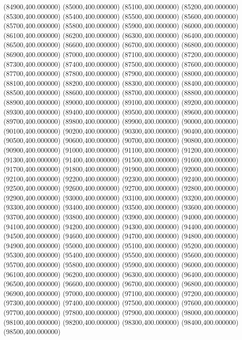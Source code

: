 (84900,400.000000)
(85000,400.000000)
(85100,400.000000)
(85200,400.000000)
(85300,400.000000)
(85400,400.000000)
(85500,400.000000)
(85600,400.000000)
(85700,400.000000)
(85800,400.000000)
(85900,400.000000)
(86000,400.000000)
(86100,400.000000)
(86200,400.000000)
(86300,400.000000)
(86400,400.000000)
(86500,400.000000)
(86600,400.000000)
(86700,400.000000)
(86800,400.000000)
(86900,400.000000)
(87000,400.000000)
(87100,400.000000)
(87200,400.000000)
(87300,400.000000)
(87400,400.000000)
(87500,400.000000)
(87600,400.000000)
(87700,400.000000)
(87800,400.000000)
(87900,400.000000)
(88000,400.000000)
(88100,400.000000)
(88200,400.000000)
(88300,400.000000)
(88400,400.000000)
(88500,400.000000)
(88600,400.000000)
(88700,400.000000)
(88800,400.000000)
(88900,400.000000)
(89000,400.000000)
(89100,400.000000)
(89200,400.000000)
(89300,400.000000)
(89400,400.000000)
(89500,400.000000)
(89600,400.000000)
(89700,400.000000)
(89800,400.000000)
(89900,400.000000)
(90000,400.000000)
(90100,400.000000)
(90200,400.000000)
(90300,400.000000)
(90400,400.000000)
(90500,400.000000)
(90600,400.000000)
(90700,400.000000)
(90800,400.000000)
(90900,400.000000)
(91000,400.000000)
(91100,400.000000)
(91200,400.000000)
(91300,400.000000)
(91400,400.000000)
(91500,400.000000)
(91600,400.000000)
(91700,400.000000)
(91800,400.000000)
(91900,400.000000)
(92000,400.000000)
(92100,400.000000)
(92200,400.000000)
(92300,400.000000)
(92400,400.000000)
(92500,400.000000)
(92600,400.000000)
(92700,400.000000)
(92800,400.000000)
(92900,400.000000)
(93000,400.000000)
(93100,400.000000)
(93200,400.000000)
(93300,400.000000)
(93400,400.000000)
(93500,400.000000)
(93600,400.000000)
(93700,400.000000)
(93800,400.000000)
(93900,400.000000)
(94000,400.000000)
(94100,400.000000)
(94200,400.000000)
(94300,400.000000)
(94400,400.000000)
(94500,400.000000)
(94600,400.000000)
(94700,400.000000)
(94800,400.000000)
(94900,400.000000)
(95000,400.000000)
(95100,400.000000)
(95200,400.000000)
(95300,400.000000)
(95400,400.000000)
(95500,400.000000)
(95600,400.000000)
(95700,400.000000)
(95800,400.000000)
(95900,400.000000)
(96000,400.000000)
(96100,400.000000)
(96200,400.000000)
(96300,400.000000)
(96400,400.000000)
(96500,400.000000)
(96600,400.000000)
(96700,400.000000)
(96800,400.000000)
(96900,400.000000)
(97000,400.000000)
(97100,400.000000)
(97200,400.000000)
(97300,400.000000)
(97400,400.000000)
(97500,400.000000)
(97600,400.000000)
(97700,400.000000)
(97800,400.000000)
(97900,400.000000)
(98000,400.000000)
(98100,400.000000)
(98200,400.000000)
(98300,400.000000)
(98400,400.000000)
(98500,400.000000)
